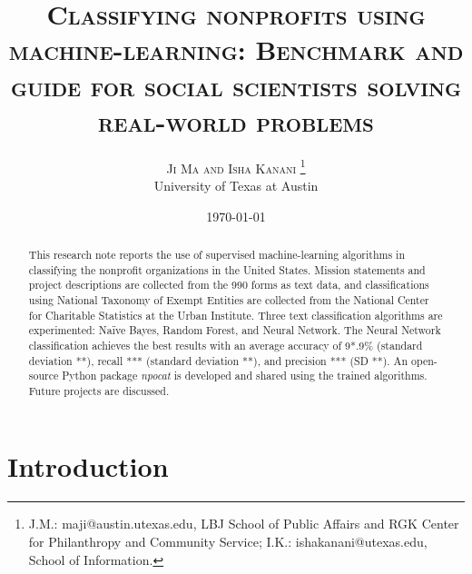 \documentclass[11pt]{article}
\title{{\textsc{Classifying nonprofits using machine-learning: Benchmark and guide for social scientists solving real-world problems}}}
\author{%
\textsc{Ji Ma and Isha Kanani} \thanks{J.M.: maji@austin.utexas.edu, LBJ School of Public Affairs and RGK Center for Philanthropy and Community Service; I.K.: ishakanani@utexas.edu, School of Information.} \\[1ex] %
\normalsize University of Texas at Austin \\ %
}
\date{\today} %
\begin{document}
\RaggedRight

\maketitle

\begin{abstract}
\noindent This research note reports the use of supervised machine-learning algorithms in classifying the nonprofit organizations in the United States. Mission statements and project descriptions are collected from the 990 forms as text data, and classifications using National Taxonomy of Exempt Entities are collected from the National Center for Charitable Statistics at the Urban Institute. Three text classification algorithms are experimented: Na\"ive Bayes, Random Forest, and Neural Network. The Neural Network classification achieves the best results with an average accuracy of 9*.9\% (standard deviation **), recall *** (standard deviation **), and precision *** (SD **). An open-source Python package \textit{npocat} is developed and shared using the trained algorithms. Future projects are discussed.

\end{abstract}
\clearpage

\tableofcontents
\listoftables
\listoffigures
\clearpage

\section{Introduction}
\end{document}
